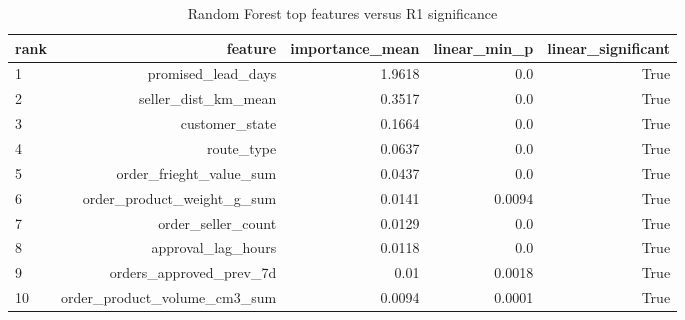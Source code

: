 \begin{table}[htbp]
\centering
\small
\caption{Random Forest top features versus R1 significance}
\begin{tabular}{lrrrr}
\toprule
rank & feature & importance\_mean & linear\_min\_p & linear\_significant \\
\midrule
1 & promised\_lead\_days & 1.9618 & 0.0 & True \\
2 & seller\_dist\_km\_mean & 0.3517 & 0.0 & True \\
3 & customer\_state & 0.1664 & 0.0 & True \\
4 & route\_type & 0.0637 & 0.0 & True \\
5 & order\_frieght\_value\_sum & 0.0437 & 0.0 & True \\
6 & order\_product\_weight\_g\_sum & 0.0141 & 0.0094 & True \\
7 & order\_seller\_count & 0.0129 & 0.0 & True \\
8 & approval\_lag\_hours & 0.0118 & 0.0 & True \\
9 & orders\_approved\_prev\_7d & 0.01 & 0.0018 & True \\
10 & order\_product\_volume\_cm3\_sum & 0.0094 & 0.0001 & True \\
\bottomrule
\end{tabular}
\par\smallskip\begin{minipage}{\linewidth}\footnotesize \end{minipage}
\end{table}

